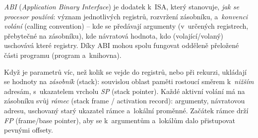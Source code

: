 \begin{definice}
\emph{ABI} (\emph{Application Binary Interface}) je dodatek k~ISA, který stanovuje, \emph{jak se procesor používá}: význam jednotlivých registrů, rozvržení zásobníku, a~\emph{konvenci volání} (calling convention) -- kde se předávají argumenty (v~určených registrech, přebytečné na zásobníku), kde návratová hodnota, kdo (volající/volaný) uschovává které registry. Díky ABI mohou spolu fungovat odděleně přeložené části programu (program a~knihovna).
\end{definice}

Když je parametrů víc, než kolik se vejde do registrů, nebo při rekurzi, ukládají se hodnoty na \emph{zásobník} (stack): souvislou oblast paměti rostoucí směrem k~\emph{nižším} adresám, s~ukazatelem vrcholu \emph{SP} (stack pointer). Každé aktivní volání má na zásobníku svůj \emph{rámec} (stack frame / activation record): argumenty, návratovou adresu, uschovaný starý ukazatel rámce a~lokální proměnné. Začátek rámce drží \emph{FP} (frame/base pointer), aby se k~argumentům a~lokálům dalo přistupovat pevnými offsety.


